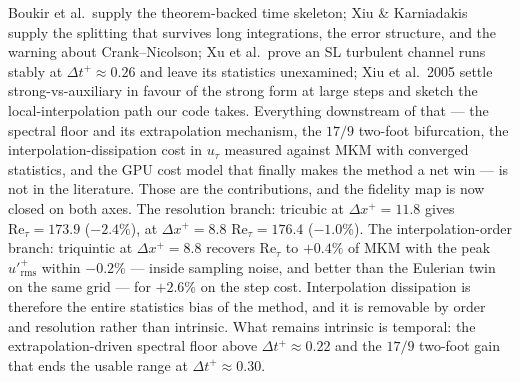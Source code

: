 \documentclass[11pt,a4paper]{article}
\newcommand{\ut}{u_\tau}
\newcommand{\Ret}{\mathrm{Re}_\tau}
\newcommand{\dtp}{\Delta t^{+}}
\begin{document}
Boukir et al.\ supply the theorem-backed time skeleton; Xiu \& Karniadakis
supply the splitting that survives long integrations, the error structure,
and the warning about Crank--Nicolson; Xu et al.\ prove an SL turbulent
channel runs stably at $\dtp\approx0.26$ and leave its statistics
unexamined; Xiu et al.\ 2005 settle strong-vs-auxiliary in favour of the
strong form at large steps and sketch the local-interpolation path our code
takes. Everything downstream of that --- the spectral floor and its
extrapolation mechanism, the $17/9$ two-foot bifurcation, the
interpolation-dissipation cost in $\ut$ measured against MKM with converged
statistics, and the GPU cost model that finally makes the method a net win
--- is not in the literature. Those are the contributions, and the fidelity
map is now closed on both axes. The resolution branch: tricubic at
$\Delta x^{+}=11.8$ gives $\Ret=173.9$ ($-2.4\%$), at $\Delta x^{+}=8.8$
$\Ret=176.4$ ($-1.0\%$). The interpolation-order branch: triquintic at
$\Delta x^{+}=8.8$ recovers $\Ret$ to $+0.4\%$ of MKM with the peak
$u'_{\mathrm{rms}}^{+}$ within $-0.2\%$ --- inside sampling noise, and
better than the Eulerian twin on the same grid --- for $+2.6\%$ on the step
cost. Interpolation dissipation is therefore the entire statistics bias of the
method, and it is removable by order and resolution rather than intrinsic. What
remains intrinsic is temporal: the extrapolation-driven spectral floor above
$\dtp\approx0.22$ and the $17/9$ two-foot gain that ends the usable range at
$\dtp\approx0.30$.
\end{document}

